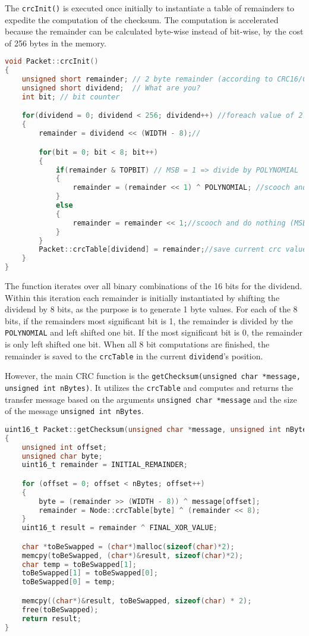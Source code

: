 The \texttt{crcInit()} is executed once initially to instantiate a table of remainders to expedite the computation of the checksum. The computation is accelerated because the remainder can be calculated byte-wise instead of bit-wise, by the cost of 256 bytes in the memory.  

\begin{lstlisting}[language=C]
void Packet::crcInit()
{
    unsigned short remainder; // 2 byte remainder (according to CRC16/CCITT standard)
    unsigned short dividend;  // What are you?
    int bit; // bit counter

    for(dividend = 0; dividend < 256; dividend++) //foreach value of 2 bytes/8 bits
    {
        remainder = dividend << (WIDTH - 8);//

        for(bit = 0; bit < 8; bit++)
        {
            if(remainder & TOPBIT) // MSB = 1 => divide by POLYNOMIAL
            {
                remainder = (remainder << 1) ^ POLYNOMIAL; //scooch and divide
            }
            else
            {
		        remainder = remainder << 1;//scooch and do nothing (MSB = 0, move along)
	        }
        }
    	Packet::crcTable[dividend] = remainder;//save current crc value in crcTable
    }
}
\end{lstlisting}

The function iterates over all binary combinations of the 16 bits for the dividend. Within this iteration each remainder is initially instantiated by shifting the dividend by 8 bits, as the purpose is to generate 1 byte values. For each of the 8 bits, if the remainders most significant bit is 1, the remainder is divided by the \texttt{POLYNOMIAL} and left shifted one bit. If the most significant bit is 0, the remainder is only left shifted one bit. When all 8 bit computations are finished, the remainder is saved to the \texttt{crcTable} in the current \texttt{dividend}'s position.

However, the main CRC function is the \texttt{getChecksum(unsigned char *message, unsigned int nBytes)}. It utilizes the \texttt{crcTable} and computes and returns the transfer message based on the arguments \texttt{unsigned char *message} and the size of the message \texttt{unsigned int nBytes}.

\begin{lstlisting}[language=C]
uint16_t Packet::getChecksum(unsigned char *message, unsigned int nBytes)
{
    unsigned int offset;
    unsigned char byte;
    uint16_t remainder = INITIAL_REMAINDER;

    for (offset = 0; offset < nBytes; offset++)
    {
        byte = (remainder >> (WIDTH - 8)) ^ message[offset];
        remainder = Node::crcTable[byte] ^ (remainder << 8);
    }
    uint16_t result = remainder ^ FINAL_XOR_VALUE;

    char *toBeSwapped = (char*)malloc(sizeof(char)*2);
    memcpy(toBeSwapped, (char*)&result, sizeof(char)*2);
    char temp = toBeSwapped[1];
    toBeSwapped[1] = toBeSwapped[0];
    toBeSwapped[0] = temp;

    memcpy((char*)&result, toBeSwapped, sizeof(char) * 2);
    free(toBeSwapped);
    return result;
}
\end{lstlisting}

